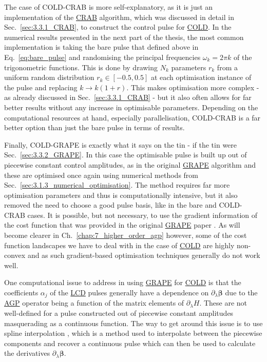 \documentclass[a4paper,oneside,11pt]{book}
\newcommand{\betabb}{\boldsymbol{\beta}}
\newcommand{\dlambda}{\partial_{\lambda}}
\newcommand{\acrref}[1]{\hyperref[acr:#1]{#1}}
\begin{document}
The case of COLD-CRAB is more self-explanatory, as it is just an implementation of the \acrref{CRAB} algorithm, which was discussed in detail in Sec.~\ref{sec:3.3.1_CRAB}, to construct the control pulse for \acrref{COLD}. In the numerical results presented in the next part of the thesis, the most common implementation is taking the bare pulse that defined above in Eq.~\eqref{eq:bare_pulse} and randomising the principal frequencies $\omega_k = 2 \pi k$ of the trigonometric functions. This is done by drawing $N_k$ parameters $r_k$ from a uniform random distribution $r_k \in [-0.5,0.5]$ at each optimisation instance of the pulse and replacing $k \rightarrow k(1+r)$. This makes optimisation more complex - as already discussed in Sec.~\ref{sec:3.3.1_CRAB} - but it also often allows for far better results without any increase in optimisable parameters. Depending on the computational resources at hand, especially parallelisation, COLD-CRAB is a far better option than just the bare pulse in terms of results.

Finally, COLD-GRAPE is exactly what it says on the tin - if the tin were Sec.~\ref{sec:3.3.2_GRAPE}. In this case the optimisable pulse is built up out of piecewise constant control amplitudes, as in the original \acrref{GRAPE} algorithm and these are optimised once again using numerical methods from Sec.~\ref{sec:3.1.3_numerical_optimisation}. The method requires far more optimisation parameters and thus is computationally intensive, but it also removed the need to choose a good pulse basis, like in the bare and COLD-CRAB cases. It is possible, but not necessary, to use the gradient information of the cost function that was provided in the original \acrref{GRAPE} paper \cite{khaneja_optimal_2005}. As will become clearer in Ch.~\ref{chap:7_higher_order_agp} however, some of the cost function landscapes we have to deal with in the case of \acrref{COLD} are highly non-convex and as such gradient-based optimisation techniques generally do not work well. 

One computational issue to address in using \acrref{GRAPE} for \acrref{COLD} is that the coefficients $\alpha_j$ of the \acrref{LCD} pulses generally have a dependence on $\dlambda \betabb$ due to the \acrref{AGP} operator being a function of the matrix elements of $\dlambda H$. These are not well-defined for a pulse constructed out of piecewise constant amplitudes masquerading as a continuous function. The way to get around this issue is to use spline interpolation \cite{noauthor_spline_nodate}, which is a method used to interpolate between the piecewise components and recover a continuous pulse which can then be used to calculate the derivatives $\dlambda \betabb$. 
\end{document}
